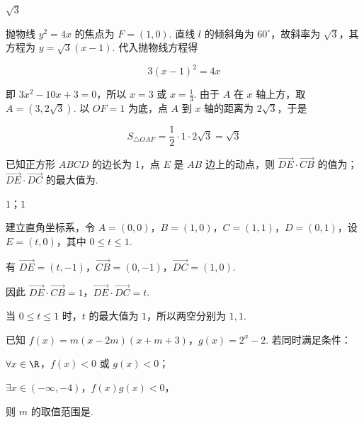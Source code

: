\begin{answer}
\(\sqrt{3}\)
\end{answer}

\begin{solution}
抛物线 \(y^2=4x\) 的焦点为 \(F=(1,0)\). 直线 \(l\) 的倾斜角为 \(60^\circ\)，故斜率为 \(\sqrt3\)，其方程为 \(y=\sqrt3(x-1)\). 代入抛物线方程得

\[
3(x-1)^2=4x
\]

即 \(3x^2-10x+3=0\)，所以 \(x=3\) 或 \(x=\frac13\). 由于 \(A\) 在 \(x\) 轴上方，取 \(A=(3,2\sqrt3)\). 以 \(OF=1\) 为底，点 \(A\) 到 \(x\) 轴的距离为 \(2\sqrt3\)，于是

\[
S_{\triangle OAF}=\frac12\cdot1\cdot2\sqrt3=\sqrt3
\]
\end{solution}

\begin{problem}
已知正方形 \(ABCD\) 的边长为 1，点 \(E\) 是 \(AB\) 边上的动点，则 \(\overrightarrow{DE} \cdot \overrightarrow{CB}\) 的值为\fillinblank{}；\(\overrightarrow{DE} \cdot \overrightarrow{DC}\) 的最大值为\fillinblank{}.
\end{problem}

\begin{answer}
\(1\)；\(1\)
\end{answer}

\begin{solution}
建立直角坐标系，令 \(A=(0,0)\)，\(B=(1,0)\)，\(C=(1,1)\)，\(D=(0,1)\)，设 \(E=(t,0)\)，其中 \(0\leqslant t\leqslant1\).

有 \(\overrightarrow{DE}=(t,-1)\)，\(\overrightarrow{CB}=(0,-1)\)，\(\overrightarrow{DC}=(1,0)\).

因此 \(\overrightarrow{DE}\cdot\overrightarrow{CB}=1\)，\(\overrightarrow{DE}\cdot\overrightarrow{DC}=t\).

当 \(0\leqslant t\leqslant1\) 时，\(t\) 的最大值为 \(1\)，所以两空分别为 \(1,1\).
\end{solution}

\begin{problem}
已知 \(f(x)=m(x-2m)(x+m+3)\)，\(g(x)=2^x-2\). 若同时满足条件：

\begin{circlelist}
\item \(\forall x\in\R\)，\(f(x)<0\) 或 \(g(x)<0\)；
\item \(\exists x\in(-\infty,-4)\)，\(f(x)g(x)<0\)，
\end{circlelist}

则 \(m\) 的取值范围是\fillinblank{}.
\end{problem}


